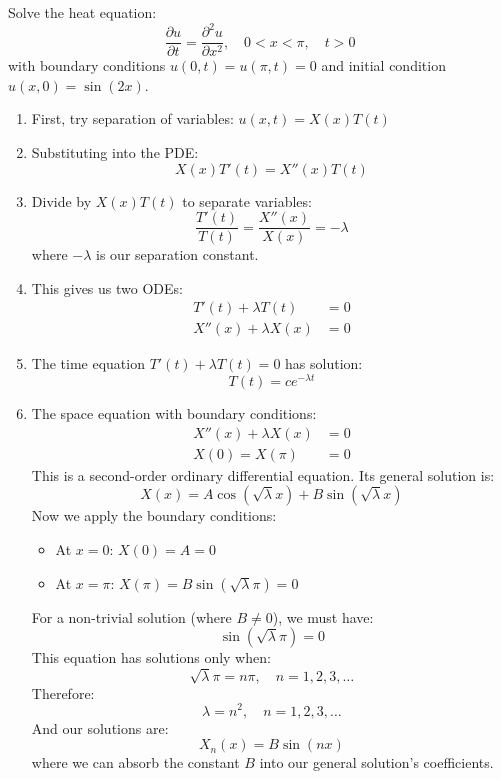 \exampleline
\begin{example}
Solve the heat equation:
\[
\frac{\partial u}{\partial t} = \frac{\partial^2 u}{\partial x^2}, \quad 0 < x < \pi, \quad t > 0
\]
with boundary conditions $u(0,t) = u(\pi,t) = 0$ and initial condition $u(x,0) = \sin(2x)$.

\begin{solution}
\begin{enumerate}
\item First, try separation of variables: $u(x,t) = X(x)T(t)$

\item Substituting into the PDE:
   \[
   X(x)T'(t) = X''(x)T(t)
   \]

\item Divide by $X(x)T(t)$ to separate variables:
   \[
   \frac{T'(t)}{T(t)} = \frac{X''(x)}{X(x)} = -\lambda
   \]
   where $-\lambda$ is our separation constant.

\item This gives us two ODEs:
   \begin{align*}
   T'(t) + \lambda T(t) &= 0 \\
   X''(x) + \lambda X(x) &= 0
   \end{align*}

\item The time equation $T'(t) + \lambda T(t) = 0$ has solution:
   \[
   T(t) = ce^{-\lambda t}
   \]

\item The space equation with boundary conditions:
  \begin{align*}
  X''(x) + \lambda X(x) &= 0 \\
  X(0) = X(\pi) &= 0
  \end{align*}
  This is a second-order ordinary differential equation. Its general solution is:
  \[
  X(x) = A\cos(\sqrt{\lambda}x) + B\sin(\sqrt{\lambda}x)
  \]
  Now we apply the boundary conditions:
  \begin{itemize}
     \item At $x=0$: $X(0) = A = 0$
     \item At $x=\pi$: $X(\pi) = B\sin(\sqrt{\lambda}\pi) = 0$
  \end{itemize}
  For a non-trivial solution (where $B \neq 0$), we must have:
  \[
  \sin(\sqrt{\lambda}\pi) = 0
  \]
  This equation has solutions only when:
  \[
  \sqrt{\lambda}\pi = n\pi, \quad n = 1,2,3,\ldots
  \]
  Therefore:
  \[
  \lambda = n^2, \quad n = 1,2,3,\ldots
  \]
  And our solutions are:
  \[
  X_n(x) = B\sin(nx)
  \]
  where we can absorb the constant $B$ into our general solution's coefficients.


\end{enumerate}
\end{solution}
\end{example}
